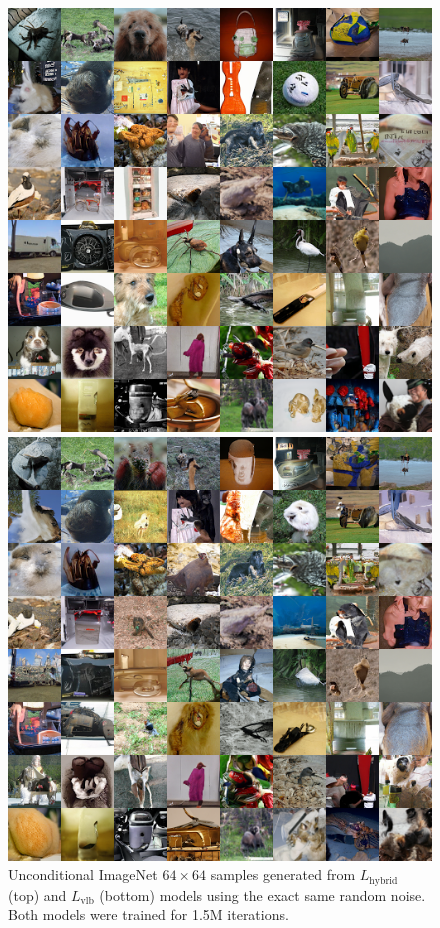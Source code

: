 \documentclass{article}
\begin{document}
\begin{figure}[t]
    \centerline{\includegraphics[width=0.78\columnwidth]{samples_hybrid_1.5M_grid.png}}
    \vskip 0.1in
    \centerline{\includegraphics[width=0.78\columnwidth]{samples_vlb_1.5M_grid.png}}
    \caption{\label{fig:uncondvlbcomparison} Unconditional ImageNet $64 \times 64$ samples generated from $L_{\text{hybrid}}$ (top) and $L_{\text{vlb}}$ (bottom) models using the exact same random noise. Both models were trained for 1.5M iterations.}
\end{figure}
\end{document}

